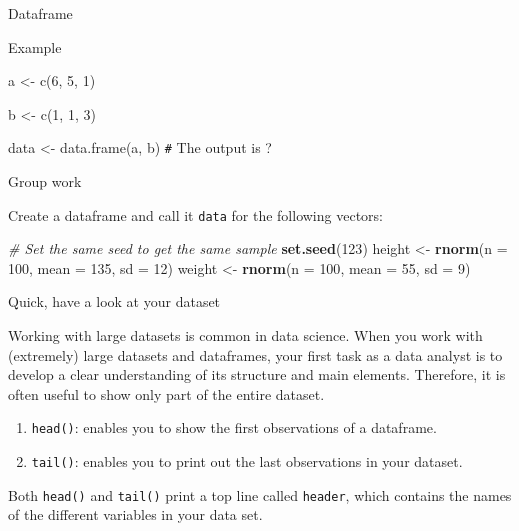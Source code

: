 \documentclass[
  ignorenonframetext,
]{beamer}
\newenvironment{Shaded}{\begin{snugshade}}{\end{snugshade}}
\newcommand{\CommentTok}[1]{\textcolor[rgb]{0.56,0.35,0.01}{\textit{#1}}}
\newcommand{\DataTypeTok}[1]{\textcolor[rgb]{0.13,0.29,0.53}{#1}}
\newcommand{\DecValTok}[1]{\textcolor[rgb]{0.00,0.00,0.81}{#1}}
\newcommand{\KeywordTok}[1]{\textcolor[rgb]{0.13,0.29,0.53}{\textbf{#1}}}
\newcommand{\NormalTok}[1]{#1}
\newcommand{\StringTok}[1]{\textcolor[rgb]{0.31,0.60,0.02}{#1}}
\begin{document}
\begin{frame}[fragile]{Dataframe}
\protect\hypertarget{dataframe-1}{}

\begin{block}{Example}

a \textless- c(6, 5, 1)

b \textless- c(1, 1, 3)

data \textless- data.frame(a, b) \texttt{\#} The output is ?

\end{block}

\begin{block}{Group work}

Create a dataframe and call it \texttt{data} for the following vectors:

\begin{Shaded}
\begin{Highlighting}[]
\CommentTok{# Set the same seed to get the same sample}
\KeywordTok{set.seed}\NormalTok{(}\DecValTok{123}\NormalTok{)}
\NormalTok{height <-}\StringTok{ }\KeywordTok{rnorm}\NormalTok{(}\DataTypeTok{n =} \DecValTok{100}\NormalTok{, }\DataTypeTok{mean =} \DecValTok{135}\NormalTok{, }\DataTypeTok{sd =} \DecValTok{12}\NormalTok{)}
\NormalTok{weight <-}\StringTok{ }\KeywordTok{rnorm}\NormalTok{(}\DataTypeTok{n =} \DecValTok{100}\NormalTok{, }\DataTypeTok{mean =} \DecValTok{55}\NormalTok{, }\DataTypeTok{sd =} \DecValTok{9}\NormalTok{)}
\end{Highlighting}
\end{Shaded}

\end{block}

\end{frame}

\begin{frame}[fragile]{Quick, have a look at your dataset}
\protect\hypertarget{quick-have-a-look-at-your-dataset}{}

Working with large datasets is common in data science. When you work
with (extremely) large datasets and dataframes, your first task as a
data analyst is to develop a clear understanding of its structure and
main elements. Therefore, it is often useful to show only part of the
entire dataset.

\begin{enumerate}
\item
  \texttt{head()}: enables you to show the first observations of a
  dataframe.
\item
  \texttt{tail()}: enables you to print out the last observations in
  your dataset.
\end{enumerate}

Both \texttt{head()} and \texttt{tail()} print a top line called
\texttt{header}, which contains the names of the different variables in
your data set.

\end{frame}
\end{document}
